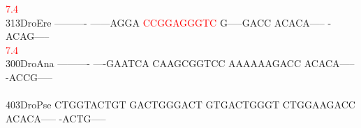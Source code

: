 \documentclass[11pt,twoside,reqno,a4paper]{article}
\begin{document}
{\hspace*{4\charwidth}\hspace*{7\charwidth}\hspace*{1\charwidth}\hspace*{1\charwidth}\hspace*{20\charwidth}\textcolor{red}{7.4}\hspace*{1\charwidth}\hspace*{1\charwidth}\hspace*{1\charwidth}\hspace*{1\charwidth}\\
313\hspace*{1\charwidth}DroEre	----------	------AGGA	\textcolor{red}{C}\textcolor{red}{C}\textcolor{red}{G}\textcolor{red}{G}\textcolor{red}{A}\textcolor{red}{G}\textcolor{red}{G}\textcolor{red}{G}\textcolor{red}{T}\textcolor{red}{C}	G-----GACC	ACACA-----	-ACAG-----	\\
\hspace*{4\charwidth}\hspace*{7\charwidth}\hspace*{1\charwidth}\hspace*{1\charwidth}\hspace*{20\charwidth}\textcolor{red}{7.4}\hspace*{1\charwidth}\hspace*{1\charwidth}\hspace*{1\charwidth}\hspace*{1\charwidth}\\
300\hspace*{1\charwidth}DroAna	----------	----GAATCA	CAAGCGGTCC	AAAAAAGACC	ACACA-----	-ACCG-----	\\
\hspace*{4\charwidth}\hspace*{7\charwidth}\hspace*{1\charwidth}\hspace*{1\charwidth}\hspace*{1\charwidth}\hspace*{1\charwidth}\hspace*{1\charwidth}\hspace*{1\charwidth}\\
403\hspace*{1\charwidth}DroPse	CTGGTACTGT	GACTGGGACT	GTGACTGGGT	CTGGAAGACC	ACACA-----	-ACTG-----	\\
\hspace*{4\charwidth}\hspace*{7\charwidth}\hspace*{1\charwidth}\hspace*{1\charwidth}\hspace*{1\charwidth}\hspace*{1\charwidth}\hspace*{1\charwidth}\hspace*{1\charwidth}\\
}
\end{document}
